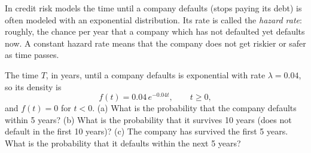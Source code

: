 
\begin{problem}
	\begin{context}
		In credit risk models the time until a company defaults (stops paying
		its debt) is often modeled with an exponential distribution. Its rate
		is called the \emph{hazard rate}: roughly, the chance per year that a
		company which has not defaulted yet defaults now. A constant hazard rate
		means that the company does not get riskier or safer as time passes.
	\end{context}
	The time $T$, in years, until a company defaults is exponential with rate
	$\lambda=0.04$, so its density is
	\[ f(t)=0.04\,e^{-0.04t},\qquad t\ge0, \]
	and $f(t)=0$ for $t<0$.
	(a) What is the probability that the company defaults within 5 years?
	(b) What is the probability that it survives 10 years (does not default
	in the first 10 years)?
	(c) The company has survived the first 5 years. What is the probability
	that it defaults within the next 5 years?
\end{problem}

